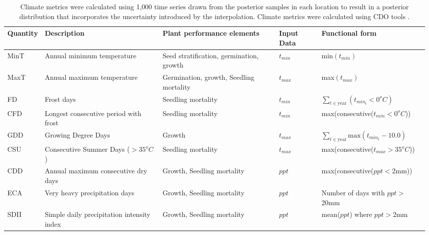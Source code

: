 \documentclass[12pt]{article}
\begin{document}

\begin{table}[left]
\begin{small}
  \begin{tabular}{p{1.6cm}|p{4cm}|p{3.5cm}|p{1cm}|p{6cm}}
    \hline
    Quantity & Description & Plant performance elements & Input Data & Functional form\\
    \hline
    MinT & Annual minimum temperature & Seed stratification, germination,    growth &  $t_{min}$ & min$(t_{min})$\\
   MaxT & Annual maximum temperature & Germination, growth, Seedling mortality &  $t_{max}$ & max$(t_{max})$\\
 
   FD & Frost days & Seedling mortality & $t_{min}$ & $\sum_{t\in\text{year}}(t_{min_t}<0^oC)$\\
    CFD & Longest consecutive period with frost & Seedling mortality & $t_{min}$ &
    max(consecutive($t_{min}<0^oC$))\\
    GDD & Growing Degree Days & Growth & $t_{max}$ &$\sum_{t\in\text{year}}\text{max}(t_{min_t}-10.0)$\\
    CSU & Consecutive Summer Days ($>35^oC$) & Seedling mortality & $t_{max}$ & max(consecutive($t_{max}>35^oC$))\\
      CDD & Annual maximum consecutive dry days & Growth, Seedling
    mortality & $ppt$ & max(consecutive($ppt<$2mm))\\
    ECA & Very heavy precipitation days & Growth,
   Seedling mortality & $ppt$ & Number of days with $ppt>$20mm \\
   SDII & Simple daily precipitation intensity index & Growth,
   Seedling mortality & $ppt$ & mean($ppt$) where $ppt>$2mm\\
  \end{tabular}
\end{small}
  \caption{Climate metrics were calculated using 1,000 time series
    drawn from the posterior samples in each location to result in a
    posterior distribution that incorporates the uncertainty
    introduced by the interpolation. Climate metrics were calculated
    using CDO tools \citep{mueller_climate_2013}.}
  \label{tab:climmet}
\end{table}
\end{document}
